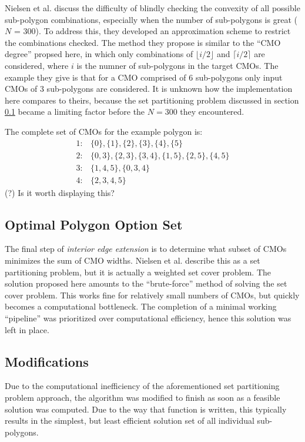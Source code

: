 Nielsen et al. discuss the difficulty of blindly checking the convexity of all possible sub-polygon combinations, especially when the number of sub-polygons is great ($N$ = 300)\cite{IntEdgeExt}.
To address this, they developed an approximation scheme to restrict the combinations checked.
The method they propose is similar to the ``CMO degree'' propsed here, in which only combinations of $\lfloor i/2 \rfloor$ and $\lceil i/2 \rceil$ are considered, where $i$ is the numner of sub-polygons in the target CMOs.
The example they give is that for a CMO comprised of 6 sub-polygons only input CMOs of 3 sub-polygons are considered.
It is unknown how the implementation here compares to theirs, because the set partitioning problem discussed in section \ref{OptimalCMOs} became a limiting factor before the $N=300$ they encountered.

The complete set of CMOs for the example polygon is:
\[
\begin{split}
	1:& \{0\},\{1\},\{2\},\{3\},\{4\},\{5\}\\
	2:& \{0,3\},\{2,3\},\{3,4\},\{1,5\},\{2,5\},\{4,5\}\\
	3:& \{1,4,5\},\{0,3,4\}\\
	4:& \{2,3,4,5\}
\end{split}
\]
(?) Is it worth displaying this?

\subsection{Optimal Polygon Option Set}\label{OptimalCMOs}
The final step of \textit{interior edge extension} is to determine what subset of CMOs minimizes the sum of CMO widths.
Nielsen et al. describe this as a set partitioning problem\cite{IntEdgeExt}, but it is actually a weighted set cover problem.
The solution proposed here amounts to the ``brute-force'' method of solving the set cover problem.
This works fine for relatively small numbers of CMOs, but quickly becomes a computational bottleneck.
The completion of a minimal working ``pipeline'' was prioritized over computational efficiency, hence this solution was left in place.

\subsection{Modifications}
Due to the computational inefficiency of the aforementioned set partitioning problem approach, the algorithm was modified to finish as soon as a feasible solution was computed.
Due to the way that function is written, this typically results in the simplest, but least efficient solution set of all individual sub-polygons.

